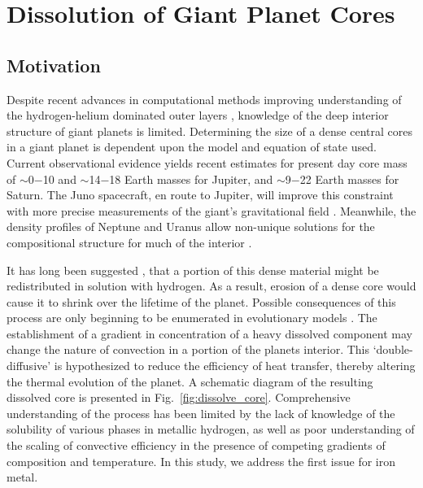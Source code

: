 \chapter{Dissolution of Giant Planet Cores}\label{chap5}

\section{Motivation}

Despite recent advances in computational methods improving understanding of
the hydrogen-helium dominated outer layers
\citep{Mcmahon2012,French2012,militzer2013a,Wilson2010}, knowledge of the deep interior structure
of giant planets is limited.
Determining the size of a dense central cores in a giant planet is dependent upon
the model and equation of state used.
Current observational evidence yields recent estimates for present day core
mass of
$\sim$0$-$10 \citep{Guillot2005} and $\sim$14$-$18 \citep{Militzer2008} Earth masses for Jupiter, and
$\sim$9$-$22 \citep{Guillot2005} Earth masses for Saturn.
The Juno spacecraft, en route to Jupiter, will improve this constraint with more 
precise measurements of the giant's gravitational field \citep{Helled2011}. 
Meanwhile, the density profiles of Neptune and Uranus allow non-unique solutions 
for the compositional structure for much of the interior
\citep{Guillot1999b,Guillot2005}.

It has long been suggested \citep{Stevenson1982a,Stevenson1982b}, that a portion of
this dense material might be redistributed in solution with hydrogen. As a
result, erosion of a dense core would cause it to shrink over the lifetime of
the planet. Possible consequences of this process are only beginning to be
enumerated in evolutionary models \citep{Chabrier2007,Leconte2012,Mirouh2012}. The
establishment of a gradient in concentration of a heavy dissolved component may
change the nature of convection in a portion of the planets interior. This
`double-diffusive' is hypothesized to reduce the efficiency of heat transfer,
thereby altering the thermal evolution of the planet. A schematic diagram of
the resulting dissolved core is presented in Fig.~\ref{fig:dissolve_core}.
Comprehensive understanding of the process has been limited by the lack of
knowledge of the solubility of various phases in metallic hydrogen, as well as
poor understanding of the scaling of convective efficiency in the presence of
competing gradients of composition and temperature. In this study, we address
the first issue for iron metal.


